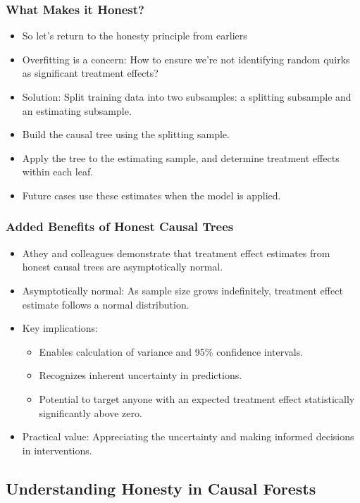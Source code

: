\documentclass{beamer}
\begin{document}
\begin{frame}
\frametitle{What Makes it Honest?}
\begin{itemize}
	\item So let's return to the honesty principle from earliers
    \item Overfitting is a concern: How to ensure we're not identifying random quirks as significant treatment effects?
    \item Solution: Split training data into two subsamples: a splitting subsample and an estimating subsample.
    \item Build the causal tree using the splitting sample.
    \item Apply the tree to the estimating sample, and determine treatment effects within each leaf.
    \item Future cases use these estimates when the model is applied.
\end{itemize}
\end{frame}

\begin{frame}
\frametitle{Added Benefits of Honest Causal Trees}
\begin{itemize}
    \item Athey and colleagues demonstrate that treatment effect estimates from honest causal trees are asymptotically normal.
    \item Asymptotically normal: As sample size grows indefinitely, treatment effect estimate follows a normal distribution.
    \item Key implications:
    \begin{itemize}
        \item Enables calculation of variance and 95\% confidence intervals.
        \item Recognizes inherent uncertainty in predictions.
        \item Potential to target anyone with an expected treatment effect statistically significantly above zero.
    \end{itemize}
    \item Practical value: Appreciating the uncertainty and making informed decisions in interventions.
\end{itemize}
\end{frame}


\subsection{Understanding Honesty in Causal Forests}
\end{document}
